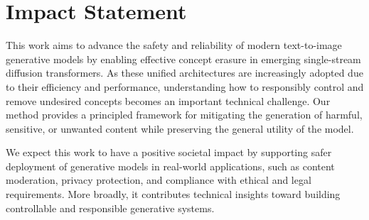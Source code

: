 \documentclass{article}
\theoremstyle{plain}
\theoremstyle{definition}
\theoremstyle{remark}
\begin{document}
\newpage
\section*{Impact Statement}
This work aims to advance the safety and reliability of modern text-to-image generative models by enabling effective concept erasure in emerging single-stream diffusion transformers. As these unified architectures are increasingly adopted due to their efficiency and performance, understanding how to responsibly control and remove undesired concepts becomes an important technical challenge. Our method provides a principled framework for mitigating the generation of harmful, sensitive, or unwanted content while preserving the general utility of the model.

We expect this work to have a positive societal impact by supporting safer deployment of generative models in real-world applications, such as content moderation, privacy protection, and compliance with ethical and legal requirements. More broadly, it contributes technical insights toward building controllable and responsible generative systems.

\newpage



\newpage
\appendix
\onecolumn


\end{document}
